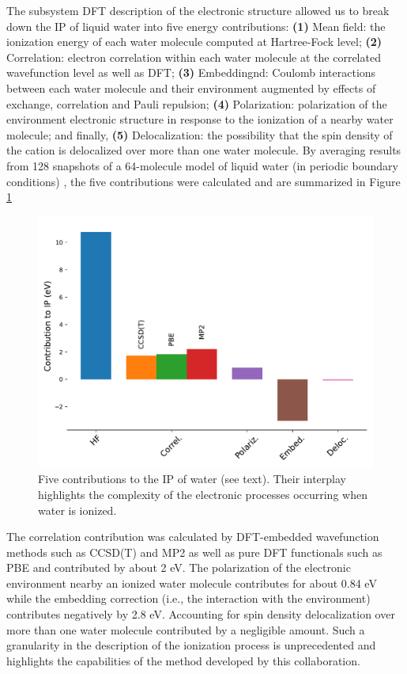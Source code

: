\documentclass[notitlepage,12pt]{report}
\begin{document}
    The subsystem DFT description of the electronic structure allowed us to break down the IP of liquid water  into five energy contributions:  {\bf (1)} Mean field: the ionization energy of each water molecule computed at Hartree-Fock level; {\bf (2)} Correlation: electron correlation within each water molecule at the correlated wavefunction level as well as DFT; {\bf (3)} Embeddingnd: Coulomb interactions between each water molecule and their environment augmented by effects of exchange, correlation and Pauli repulsion; {\bf (4)} Polarization: polarization of the environment electronic structure in response to the ionization of a nearby water molecule; and finally, {\bf (5)} Delocalization: the possibility that the spin density of the cation is delocalized over more than one water molecule. By averaging results from  128  snapshots of a 64-molecule model of liquid water (in periodic boundary conditions) \supercite{gaiduk2018electron}, the five contributions were calculated and are summarized in Figure \ref{cont_ip} 
\begin{figure}
	\includegraphics[width=\linewidth]{./images/contribution_liquidwater_PI}
    \caption{\label{cont_ip}Five contributions to the IP of water (see text). Their interplay highlights the complexity of the electronic processes occurring when water is ionized. \supercite{}}
\end{figure}
    The correlation contribution was calculated by DFT-embedded wavefunction methods such as CCSD(T) and MP2 as well as pure DFT functionals such as PBE and contributed by about 2 eV. The polarization of the electronic environment nearby an ionized water molecule contributes for about 0.84 eV while the embedding correction (i.e., the interaction with the environment) contributes negatively by 2.8 eV. Accounting for spin density delocalization over more than one water molecule contributed by a negligible amount. Such a granularity in the description of the ionization process is unprecedented and highlights the capabilities of the method developed by this collaboration. 	
	
\end{document}
